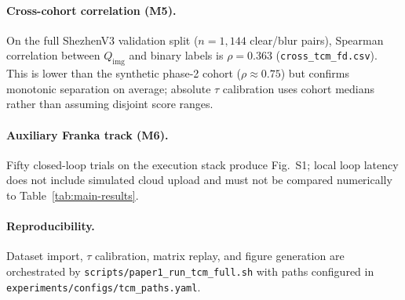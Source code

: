 \paragraph{Cross-cohort correlation (M5).}
On the full ShezhenV3 validation split ($n{=}1{,}144$ clear/blur pairs), Spearman correlation between $Q_{\mathrm{img}}$ and binary labels is $\rho{=}0.363$ (\texttt{cross\_tcm\_fd.csv}).
This is lower than the synthetic phase-2 cohort ($\rho{\approx}0.75$) but confirms monotonic separation on average; absolute $\tau$ calibration uses cohort medians rather than assuming disjoint score ranges.

\paragraph{Auxiliary Franka track (M6).}
Fifty closed-loop trials on the execution stack produce Fig.~S1; local loop latency does not include simulated cloud upload and must not be compared numerically to Table~\ref{tab:main-results}.

\paragraph{Reproducibility.}
Dataset import, $\tau$ calibration, matrix replay, and figure generation are orchestrated by \texttt{scripts/paper1\_run\_tcm\_full.sh} with paths configured in \texttt{experiments/configs/tcm\_paths.yaml}.
